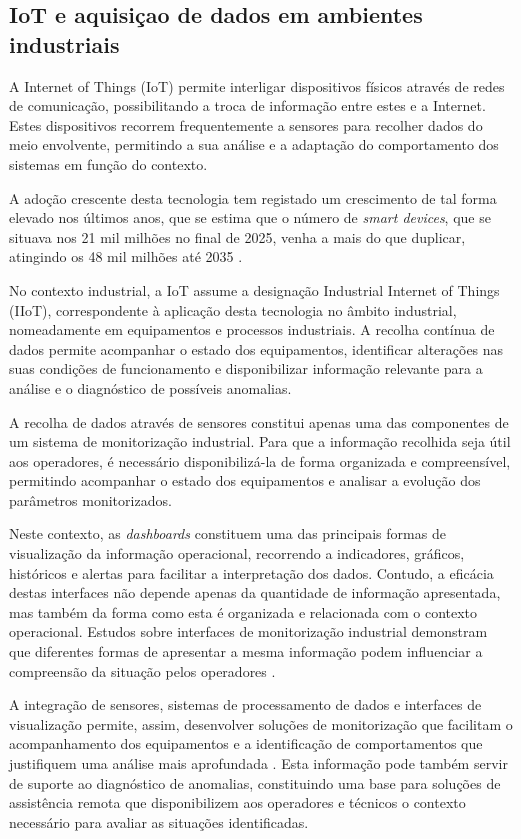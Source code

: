 \documentclass[conference,a4paper]{IEEEtran}
\begin{document}
\subsection{IoT e aquisiçao de dados em ambientes industriais}

A Internet of Things (IoT) permite interligar dispositivos físicos através de redes de comunicação, possibilitando a troca de informação entre estes e a Internet. Estes dispositivos recorrem frequentemente a sensores para recolher dados do meio envolvente, permitindo a sua análise e a adaptação do comportamento dos sistemas em função do contexto.

A adoção crescente desta tecnologia tem registado um crescimento de tal forma elevado nos últimos anos, que se estima que o número de \textit{smart devices}, que se situava nos 21 mil milhões no final de 2025, venha a mais do que duplicar, atingindo os 48 mil milhões até 2035 \cite{transforma2026iot}.

No contexto industrial, a IoT assume a designação Industrial Internet of Things (IIoT), correspondente à aplicação desta tecnologia no âmbito industrial, nomeadamente em equipamentos e processos industriais. A recolha contínua de dados permite acompanhar o estado dos equipamentos, identificar alterações nas suas condições de funcionamento e disponibilizar informação relevante para a análise e o diagnóstico de possíveis anomalias.


A recolha de dados através de sensores constitui apenas uma das componentes de um sistema de monitorização industrial. Para que a informação recolhida seja útil aos operadores, é necessário disponibilizá-la de forma organizada e compreensível, permitindo acompanhar o estado dos equipamentos e analisar a evolução dos parâmetros monitorizados.

Neste contexto, as \textit{dashboards} constituem uma das principais formas de visualização da informação operacional, recorrendo a indicadores, gráficos, históricos e alertas para facilitar a interpretação dos dados. Contudo, a eficácia destas interfaces não depende apenas da quantidade de informação apresentada, mas também da forma como esta é organizada e relacionada com o contexto operacional. Estudos sobre interfaces de monitorização industrial demonstram que diferentes formas de apresentar a mesma informação podem influenciar a compreensão da situação pelos operadores \cite{doi:10.1177/154193121005400411}.

A integração de sensores, sistemas de processamento de dados e interfaces de visualização permite, assim, desenvolver soluções de monitorização que facilitam o acompanhamento dos equipamentos e a identificação de comportamentos que justifiquem uma análise mais aprofundada \cite{reis2024infraestrutura}. Esta informação pode também servir de suporte ao diagnóstico de anomalias, constituindo uma base para soluções de assistência remota que disponibilizem aos operadores e técnicos o contexto necessário para avaliar as situações identificadas. \\
\end{document}
